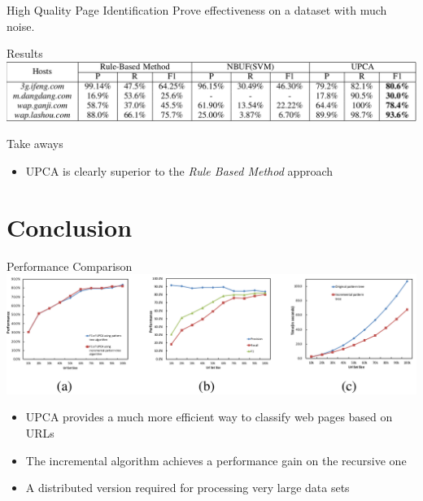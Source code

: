\documentclass[presentation]{beamer}
\begin{document}
\begin{frame}[label={sec:orgheadline24}]{High Quality Page Identification}
Prove effectiveness on a dataset with much noise.
\begin{block}{Results}
\includegraphics[width=.9\linewidth]{./rbm.png}
\end{block}
\begin{block}{Take aways}
\begin{itemize}
\item UPCA is clearly superior to the \emph{Rule Based Method} approach
\end{itemize}
\end{block}
\end{frame}

\section{Conclusion}
\label{sec:orgheadline27}
\begin{frame}[label={sec:orgheadline26}]{Performance Comparison}
\includegraphics[width=.9\linewidth]{./upca.png}

\begin{itemize}
\item UPCA provides a much more efficient way to classify web pages based on URLs
\item The incremental algorithm achieves a performance gain on the recursive one
\item A distributed version required for processing very large data sets
\end{itemize}
\end{frame}
\end{document}
